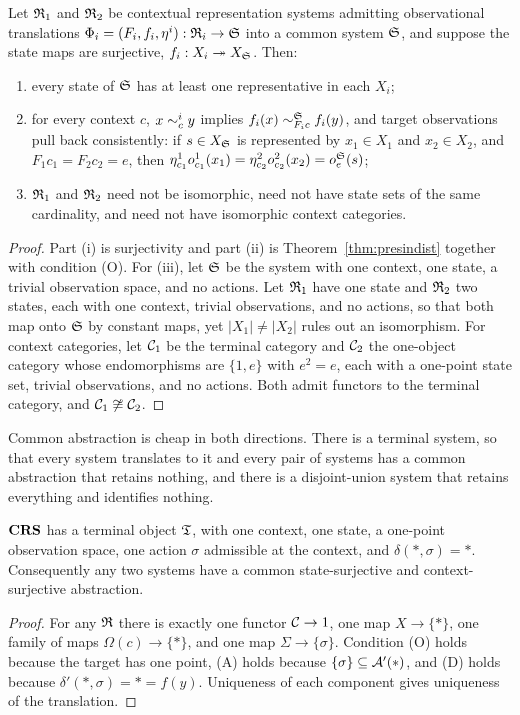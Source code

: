 \begin{theorem}\label{thm:central}
Let $\mathfrak R_1$ and $\mathfrak R_2$ be contextual representation systems admitting observational translations $\Phi_i=(F_i,f_i,\eta^i):\mathfrak R_i\to\mathfrak S$ into a common system $\mathfrak S$, and suppose the state maps are surjective, $f_i:X_i\twoheadrightarrow X_{\mathfrak S}$. Then:
\begin{enumerate}[label=(\roman*)]
\item every state of $\mathfrak S$ has at least one representative in each $X_i$;
\item for every context $c$, $x\sim^i_cy$ implies $f_i(x)\sim^{\mathfrak S}_{F_ic}f_i(y)$, and target observations pull back consistently: if $s\in X_{\mathfrak S}$ is represented by $x_1\in X_1$ and $x_2\in X_2$, and $F_1c_1=F_2c_2=e$, then $\eta^1_{c_1}o^1_{c_1}(x_1)=\eta^2_{c_2}o^2_{c_2}(x_2)=o^{\mathfrak S}_e(s)$;
\item $\mathfrak R_1$ and $\mathfrak R_2$ need not be isomorphic, need not have state sets of the same cardinality, and need not have isomorphic context categories.
\end{enumerate}
\end{theorem}
\begin{proof}
Part (i) is surjectivity and part (ii) is Theorem~\ref{thm:presindist} together with condition (O). For (iii), let $\mathfrak S$ be the system with one context, one state, a trivial observation space, and no actions. Let $\mathfrak R_1$ have one state and $\mathfrak R_2$ two states, each with one context, trivial observations, and no actions, so that both map onto $\mathfrak S$ by constant maps, yet $|X_1|\neq|X_2|$ rules out an isomorphism. For context categories, let $\mathcal C_1$ be the terminal category and $\mathcal C_2$ the one-object category whose endomorphisms are $\{1,e\}$ with $e^2=e$, each with a one-point state set, trivial observations, and no actions. Both admit functors to the terminal category, and $\mathcal C_1\not\cong\mathcal C_2$.
\end{proof}

Common abstraction is cheap in both directions. There is a terminal system, so that every system translates to it and every pair of systems has a common abstraction that retains nothing, and there is a disjoint-union system that retains everything and identifies nothing.

\begin{proposition}\label{prop:trivialabs}
$\mathbf{CRS}$ has a terminal object $\mathfrak T$, with one context, one state, a one-point observation space, one action $\sigma$ admissible at the context, and $\delta(\ast,\sigma)=\ast$. Consequently any two systems have a common state-surjective and context-surjective abstraction.
\end{proposition}
\begin{proof}
For any $\mathfrak R$ there is exactly one functor $\mathcal C\to1$, one map $X\to\{\ast\}$, one family of maps $\Omega(c)\to\{\ast\}$, and one map $\Sigma\to\{\sigma\}$. Condition (O) holds because the target has one point, (A) holds because $\{\sigma\}\subseteq\mathcal A'(\ast)$, and (D) holds because $\delta'(\ast,\sigma)=\ast=f(y)$. Uniqueness of each component gives uniqueness of the translation.
\end{proof}

